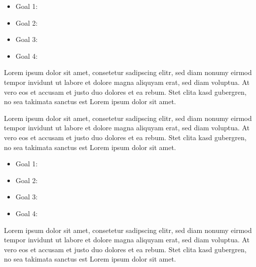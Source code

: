 \evening

\begin{status}
  \begin{itemize}
    \item Goal 1: 
    \item Goal 2: 
    \item Goal 3: 
    \item Goal 4: 
  \end{itemize}
\end{status}


\begin{problem}
  Lorem ipsum dolor sit amet, consetetur sadipscing elitr, sed diam nonumy
  eirmod tempor invidunt ut labore et dolore magna aliquyam erat, sed diam
  voluptua. At vero eos et accusam et justo duo dolores et ea rebum. Stet clita
  kasd gubergren, no sea takimata sanctus est Lorem ipsum dolor sit amet.
\end{problem}

\begin{example}
  Lorem ipsum dolor sit amet, consetetur sadipscing elitr, sed diam nonumy
  eirmod tempor invidunt ut labore et dolore magna aliquyam erat, sed diam
  voluptua. At vero eos et accusam et justo duo dolores et ea rebum. Stet clita
  kasd gubergren, no sea takimata sanctus est Lorem ipsum dolor sit amet.
\end{example}

\night

\begin{results}
  \begin{itemize}
    \item Goal 1: 
    \item Goal 2: 
    \item Goal 3: 
    \item Goal 4: 
  \end{itemize}
\end{results}


\begin{rant}
  Lorem ipsum dolor sit amet, consetetur sadipscing elitr, sed diam nonumy
  eirmod tempor invidunt ut labore et dolore magna aliquyam erat, sed diam
  voluptua. At vero eos et accusam et justo duo dolores et ea rebum. Stet clita
  kasd gubergren, no sea takimata sanctus est Lorem ipsum dolor sit amet.
\end{rant}

